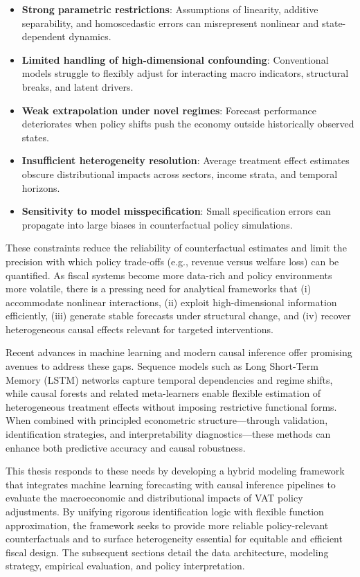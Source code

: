 \begin{itemize}
  \item \textbf{Strong parametric restrictions}: Assumptions of linearity, additive separability, and homoscedastic errors can misrepresent nonlinear and state-dependent dynamics.
  \item \textbf{Limited handling of high-dimensional confounding}: Conventional models struggle to flexibly adjust for interacting macro indicators, structural breaks, and latent drivers.
  \item \textbf{Weak extrapolation under novel regimes}: Forecast performance deteriorates when policy shifts push the economy outside historically observed states.
  \item \textbf{Insufficient heterogeneity resolution}: Average treatment effect estimates obscure distributional impacts across sectors, income strata, and temporal horizons.
  \item \textbf{Sensitivity to model misspecification}: Small specification errors can propagate into large biases in counterfactual policy simulations.
\end{itemize}

These constraints reduce the reliability of counterfactual estimates and limit the precision with which policy trade-offs (e.g., revenue versus welfare loss) can be quantified. As fiscal systems become more data-rich and policy environments more volatile, there is a pressing need for analytical frameworks that (i) accommodate nonlinear interactions, (ii) exploit high-dimensional information efficiently, (iii) generate stable forecasts under structural change, and (iv) recover heterogeneous causal effects relevant for targeted interventions.

Recent advances in machine learning and modern causal inference offer promising avenues to address these gaps. Sequence models such as Long Short-Term Memory (LSTM) networks capture temporal dependencies and regime shifts, while causal forests and related meta-learners enable flexible estimation of heterogeneous treatment effects without imposing restrictive functional forms. When combined with principled econometric structure—through validation, identification strategies, and interpretability diagnostics—these methods can enhance both predictive accuracy and causal robustness.

This thesis responds to these needs by developing a hybrid modeling framework that integrates machine learning forecasting with causal inference pipelines to evaluate the macroeconomic and distributional impacts of VAT policy adjustments. By unifying rigorous identification logic with flexible function approximation, the framework seeks to provide more reliable policy-relevant counterfactuals and to surface heterogeneity essential for equitable and efficient fiscal design. The subsequent sections detail the data architecture, modeling strategy, empirical evaluation, and policy interpretation.


